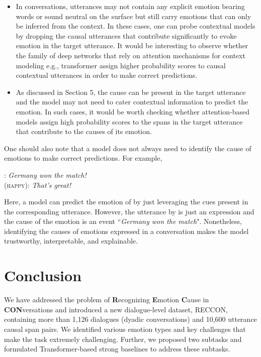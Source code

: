 \documentclass[smallextended]{svjour3}
\newcommand\emo[1]{\textsc{#1}}
\newcommand\RECCONDA{RECCON}
\newcommand\0{\hphantom{0}}
\begin{document}
\begin{itemize}[leftmargin=*]
    \item In conversations, utterances may not contain any explicit emotion bearing words or sound neutral on the surface but still carry emotions that can only be inferred from the context. In these cases, one can probe contextual models by dropping the causal utterances that contribute significantly to evoke emotion in the target utterance. It would be interesting to observe whether the family of deep networks that rely on attention mechanisms for context modeling e.g., transformer assign higher probability scores to causal contextual utterances in order to make correct predictions.
    \item As discussed in Section 5, the cause can be present in the target utterance and the model may not need to cater contextual information to predict the emotion. In such cases, it would be worth checking whether attention-based models assign high probability scores to the spans in the target utterance that contribute to the causes of its emotion. 
\end{itemize}

One should also note that a model does not always need to identify the cause of emotions to make correct predictions. For example, 
\begin{exe}
\ex { (\emo{happy})}: \textit{Germany won the match!}\\
{ (\emo{happy})}: \textit{That's great!}
\end{exe}
Here, a model can predict the emotion of  by just leveraging the cues present in the corresponding utterance. However, the utterance by  is just an expression and the cause of the emotion is an event ``\textit{Germany won the match}". Nonetheless, identifying the causes of emotions expressed in a conversation makes the model trustworthy, interpretable, and explainable. 
























\section{Conclusion}
We have addressed the problem of \textbf{R}ecognizing \textbf{E}motion \textbf{C}ause in \textbf{CON}versations and introduced a new dialogue-level dataset, \RECCONDA{}, 
containing more than 1,126 dialogues (dyadic conversations) and 10,600 utterance causal span pairs. We identified various emotion types and key challenges that make the task 
extremely challenging. Further, we 
proposed two subtasks and formulated Transformer-based strong baselines to address these subtasks.
\end{document}
